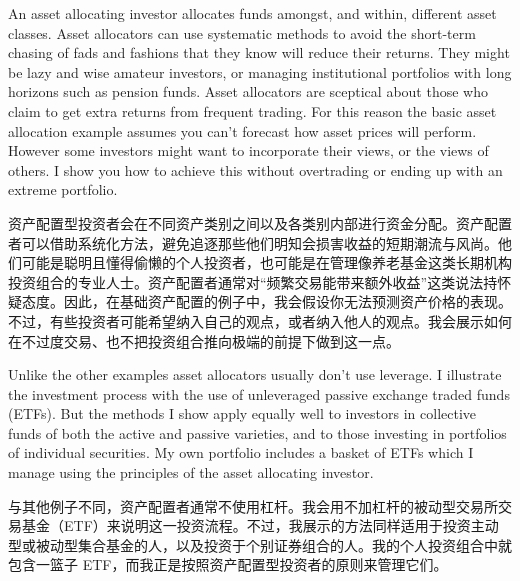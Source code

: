 
\begin{englishblock} An asset allocating investor allocates funds amongst, and within, different asset classes. Asset allocators can use systematic methods to avoid the short-term chasing of fads and fashions that they know will reduce their returns. They might be lazy and wise amateur investors, or managing institutional portfolios with long horizons such as pension funds. Asset allocators are sceptical about those who claim to get extra returns from frequent trading. For this reason the basic asset allocation example assumes you can't forecast how asset prices will perform. However some investors might want to incorporate their views, or the views of others. I show you how to achieve this without overtrading or ending up with an extreme portfolio. \end{englishblock}

\begin{chineseblock}资产配置型投资者会在不同资产类别之间以及各类别内部进行资金分配。资产配置者可以借助系统化方法，避免追逐那些他们明知会损害收益的短期潮流与风尚。他们可能是聪明且懂得偷懒的个人投资者，也可能是在管理像养老基金这类长期机构投资组合的专业人士。资产配置者通常对“频繁交易能带来额外收益”这类说法持怀疑态度。因此，在基础资产配置的例子中，我会假设你无法预测资产价格的表现。不过，有些投资者可能希望纳入自己的观点，或者纳入他人的观点。我会展示如何在不过度交易、也不把投资组合推向极端的前提下做到这一点。\end{chineseblock}

\bipairgap

\begin{englishblock} Unlike the other examples asset allocators usually don't use leverage. I illustrate the investment process with the use of unleveraged passive exchange traded funds (ETFs). But the methods I show apply equally well to investors in collective funds of both the active and passive varieties, and to those investing in portfolios of individual securities. My own portfolio includes a basket of ETFs which I manage using the principles of the asset allocating investor. \end{englishblock}

\begin{chineseblock}与其他例子不同，资产配置者通常不使用杠杆。我会用不加杠杆的被动型交易所交易基金（ETF）来说明这一投资流程。不过，我展示的方法同样适用于投资主动型或被动型集合基金的人，以及投资于个别证券组合的人。我的个人投资组合中就包含一篮子 ETF，而我正是按照资产配置型投资者的原则来管理它们。\end{chineseblock}

